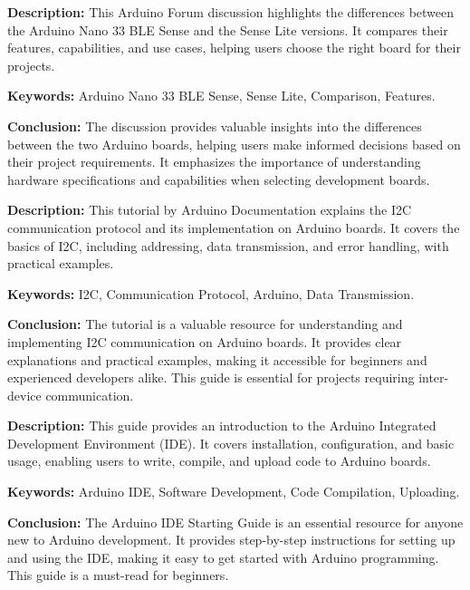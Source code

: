 {
	\textbf{Description:} This Arduino Forum discussion highlights the differences between the Arduino Nano 33 BLE Sense and the Sense Lite versions. It compares their features, capabilities, and use cases, helping users choose the right board for their projects.
	\newline
	
	\textbf{Keywords:} Arduino Nano 33 BLE Sense, Sense Lite, Comparison, Features.
	
	\newpage
	\textbf{Conclusion:} The discussion provides valuable insights into the differences between the two Arduino boards, helping users make informed decisions based on their project requirements. It emphasizes the importance of understanding hardware specifications and capabilities when selecting development boards\cite{ArduinoForum2023}.
}

{
	\textbf{Description:} This tutorial by Arduino Documentation explains the I2C communication protocol and its implementation on Arduino boards. It covers the basics of I2C, including addressing, data transmission, and error handling, with practical examples.
	\newline
	
	\textbf{Keywords:} I2C, Communication Protocol, Arduino, Data Transmission.
	
	\newpage
	\textbf{Conclusion:} The tutorial is a valuable resource for understanding and implementing I2C communication on Arduino boards. It provides clear explanations and practical examples, making it accessible for beginners and experienced developers alike. This guide is essential for projects requiring inter-device communication\cite{ArduinoI2C:2024}.
}

{
	\textbf{Description:} This guide provides an introduction to the Arduino Integrated Development Environment (IDE). It covers installation, configuration, and basic usage, enabling users to write, compile, and upload code to Arduino boards.
	\newline
	
	\textbf{Keywords:} Arduino IDE, Software Development, Code Compilation, Uploading.
	
	\newpage
	\textbf{Conclusion:} The Arduino IDE Starting Guide is an essential resource for anyone new to Arduino development. It provides step-by-step instructions for setting up and using the IDE, making it easy to get started with Arduino programming. This guide is a must-read for beginners\cite{ArduinoIDE:2024}.
}

